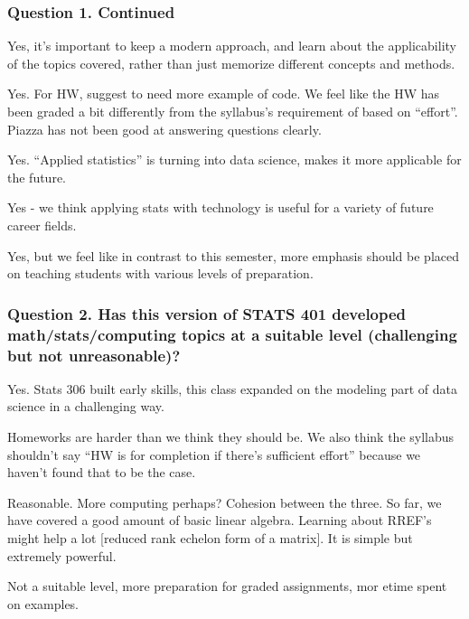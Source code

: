 \documentclass{beamer}
\begin{document}
\begin{frame}
  \frametitle{Question 1. Continued}
  
\begin{myitemize}

\item Yes, it's important to keep a modern approach, and learn about the applicability of the topics covered, rather than just memorize different concepts and methods.
\item Yes. For HW, suggest to need more example of code. We feel like the HW has been graded a bit differently from the syllabus's requirement of based on ``effort''. Piazza has not been good at answering questions clearly.
\item Yes. ``Applied statistics'' is turning into data science, makes it more applicable for the future.
\item Yes - we think applying stats with technology is useful for a variety of future career fields.
  \item Yes, but we feel like in contrast to this semester, more emphasis should be placed on teaching students with various levels of preparation.
\end{myitemize}
\end{frame}

\begin{frame}
\frametitle{Question 2. Has this version of STATS 401 developed math/stats/computing topics at a suitable level (challenging but not unreasonable)?}

\begin{myitemize}
\item Yes. Stats 306 built early skills, this class expanded on the modeling part of data science in a challenging way.
  \item Homeworks are harder than we think they should be. We also think the syllabus shouldn't say ``HW is for completion if there's sufficient effort'' because we haven't found that to be the case. 
  \item Reasonable. More computing perhaps? Cohesion between the three. So far, we have covered a good amount of basic linear algebra. Learning about RREF's might help a lot [reduced rank echelon form of a matrix]. It is simple but extremely powerful.
  \item Not a suitable level, more preparation for graded assignments, mor etime spent on examples.
\end{myitemize}
\end{frame}
\end{document}
